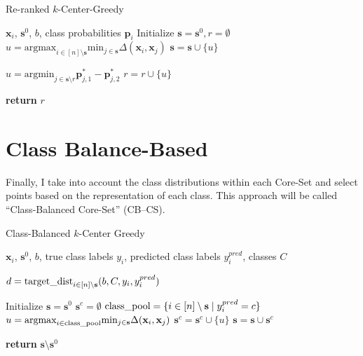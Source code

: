 \documentclass[english,bachelor,ul]{webisthesis} %
\begin{document}
\begin{algorithm}[htpb]
\caption{Re-ranked $k$-Center-Greedy}%
\label{alg:rwgc}
\begin{algorithmic}

\Require $ \mathbf{x}_i $, $ \mathbf{s}^0 $, $ b $, class probabilities $ \mathbf{p}_i $
\State Initialize $ \mathbf{s} = \mathbf{s}^0, r = \emptyset $
\Repeat
\State $ u = \text{argmax}_{i \in [n] \setminus \mathbf{s}} \text{min}_{j \in \mathbf{s}} \Delta(\mathbf{x}_i, \mathbf{x}_j) $
\State $ \mathbf{s} = \mathbf{s} \cup \{u\} $



\Repeat
\State $ u = \text{argmin}_{j \in \mathbf{s} \setminus r}\mathbf{p}_{j, 1}^* - \mathbf{p}_{j, 2}^* $
\State $ r = r \cup \{u\} $

\State \textbf{return} $ r $
\end{algorithmic}
\end{algorithm}

\section{Class Balance-Based}

Finally, I take into account the class distributions within each Core-Set and select points based on the representation of each class. This approach will be called ``Class-Balanced Core-Set'' (CB--CS).

\begin{algorithm}[htpb]
    \caption{Class-Balanced $k$-Center Greedy}%
\label{alg:classbalanced}
\begin{algorithmic}

\Require $ \mathbf{x}_i $, $ \mathbf{s}^0 $, $ b $, true class labels $ y_i $, predicted class labels $ y^{pred}_i $, classes $ C $

\State $ d = \text{target\textunderscore dist}_{i \in [n] \setminus \mathbf{s}} (b, C, y_i, y^{pred}_i) $

\State Initialize $ \mathbf{s} = \mathbf{s}^0 $
\State $ \mathbf{s}^c = \emptyset $
\State $ \text{class\textunderscore pool} = \{i \in [n] \setminus \mathbf{s} \; | \; y_i^{pred} = c\} $
\Repeat
\State $ u = \text{argmax}_{i \in \text{class\textunderscore pool}}\text{min}_{j \in \mathbf{s}} \Delta(\mathbf{x}_i, \mathbf{x}_j) $
\State $ \mathbf{s}^c = \mathbf{s}^c \cup \{u\} $
\State $ \mathbf{s} = \mathbf{s} \cup \mathbf{s}^c $
\EndFor

\State \textbf{return} $ \mathbf{s} \setminus \mathbf{s}^0 $
\end{algorithmic}
\end{algorithm}
\end{document}

